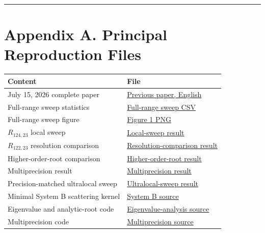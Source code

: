 \documentclass[
  10pt,
  a4paper,
]{article}
\newcounter{none} %
\begin{document}
\begin{center}\rule{0.5\linewidth}{0.5pt}\end{center}

\section{Appendix A. Principal Reproduction
Files}\label{appendix-a.-principal-reproduction-files}

{\def\LTcaptype{none} %
\begin{longtable}[]{@{}
  >{\raggedright\arraybackslash}p{}
  >{\raggedright\arraybackslash}p{}@{}}
\toprule\noalign{}
\begin{minipage}[b]{\linewidth}\raggedright
Content
\end{minipage} & \begin{minipage}[b]{\linewidth}\raggedright
File
\end{minipage} \\
\midrule\noalign{}
\endhead
\bottomrule\noalign{}
\endlastfoot
July 15, 2026 complete paper &
\href{../20260715/exchange_weight_alpha_correspondence_numerical_experiment_en.md}{Previous
paper, English} \\
Full-range sweep statistics &
\href{../20260715/minimal_system_B_gray_bugcheck_result_v1/direct_depth_probe_v5_sweep_control/high_to_ext_full_delta1e-7_stats_v5.csv}{Full-range
sweep CSV} \\
Full-range sweep figure &
\href{../20260715/system_B_full_R_sweep_full_range_depth_v1.png}{Figure
1 PNG} \\
\(R_{124,23}\) local sweep &
\href{root_centered_delta1e-12_v1/root_centered_delta1e-12_result_v1.md}{Local-sweep
result} \\
\(R_{122,23}\) resolution comparison &
\href{R122_23_root_centered_resolution_comparison_v1/R122_23_root_centered_resolution_comparison_v1.md}{Resolution-comparison
result} \\
Higher-order-root comparison &
\href{high_order_roots_centered_delta1e-12_v1/high_order_roots_centered_delta1e-12_result_v1.md}{Higher-order-root
result} \\
Multiprecision result &
\href{two_physical_roots_multiprecision_v1/two_physical_roots_multiprecision_result_v1.md}{Multiprecision
result} \\
Precision-matched ultralocal sweep &
\href{two_physical_roots_precision_matched_narrow_v1/precision_matched_narrow_result_v1.md}{Ultralocal-sweep
result} \\
Minimal System B scattering kernel &
\href{../20260715/run_minimal_system_B_gray_direct_check_v5.py}{System B
source} \\
Eigenvalue and analytic-root code &
\href{../20260717/phase5_eigenphase_resonance_v2.py}{Eigenvalue-analysis
source} \\
Multiprecision code &
\href{run_two_physical_roots_multiprecision_v1.py}{Multiprecision
source} \\
\end{longtable}
}
\end{document}
